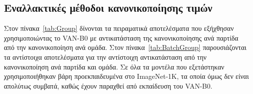 \documentclass[12pt]{article}
\numberwithin{equation}{section}
\begin{document}
\subsection*{\thesection\quad Εναλλακτικές μέθοδοι κανονικοποίησης τιμών}\label{app:B}

Στον πίνακα~\ref{tab:Group} δίνονται τα πειραματικά αποτελέσματα που εξήχθησαν χρησιμοποιώντας το VAN-B0 με αντικατάσταση της κανονικοποίησης ανά παρτίδα από την κανονικοποίηση ανά ομάδα. Στον πίνακα~\ref{tab:BatchGroup} παρουσιάζονται τα αντίστοιχα αποτελέσματα για την αντίστοιχη αντικατάσταση από την κανονικοποίηση ανά παρτίδα και ομάδα. Σε όλα τα μοντέλα που εξετάστηκαν χρησιμοποιήθηκαν βάρη προεκπαιδευμένα στο ImageNet-1K, τα οποία όμως δεν είναι απολύτως συμβατά, καθώς έχουν παραχθεί από εκπαίδευση του VAN-B0.\\
\end{document}
